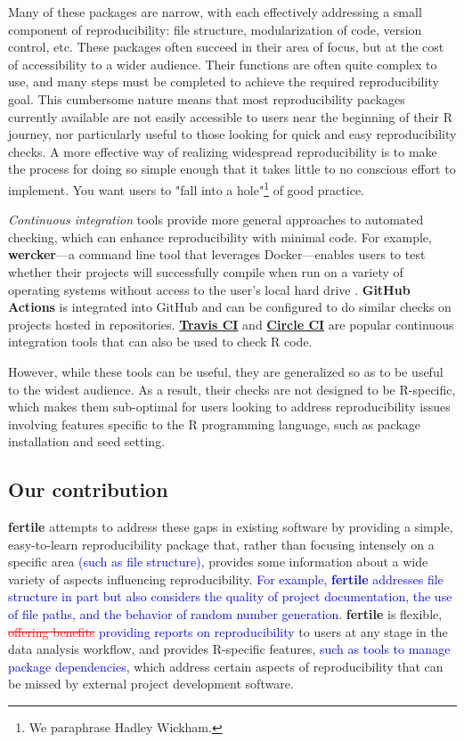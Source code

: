 \documentclass[APA,LATO1COL]{WileyNJD-v2}\usepackage[]{graphicx}\usepackage[]{color}
\newcommand{\R}{\textsf{R}\xspace}
\newcommand{\pkg}[1]{\textbf{#1}}
\begin{document}
Many of these packages are narrow, with each effectively addressing a small component of reproducibility: file structure, modularization of code, version control, etc. These packages often  succeed in their area of focus, but at the cost of accessibility to a wider audience. Their functions are often quite complex to use, and many steps must be completed to achieve the required reproducibility goal. This cumbersome nature means that most reproducibility packages currently available are not easily accessible to users near the beginning of their \R journey, nor particularly useful to those looking for quick and easy reproducibility checks.
A more effective way of realizing widespread reproducibility is to make the process for doing so simple enough that it takes little to no conscious effort to implement. You want users to "fall into a hole"\footnote{We paraphrase Hadley Wickham.} of good practice. 

\emph{Continuous integration} tools provide more general approaches to automated checking, which can enhance reproducibility with minimal code. For example, \pkg{wercker}---a command line tool that leverages Docker---enables users to test whether their projects will successfully compile when run on a variety of operating systems without access to the user's local hard drive \citep{wercker}. \pkg{GitHub Actions} is integrated into GitHub and can be configured to do similar checks on projects hosted in repositories. \href{https://travis-ci.com}{\pkg{Travis CI}} and \href{https://circleci.com/product}{\pkg{Circle CI}} are popular continuous integration tools that can also be used to check \R code. 

However, while these tools can be useful, they are generalized so as to be useful to the widest audience. As a result, their checks are not designed to be \R-specific, which makes them sub-optimal for users looking to address reproducibility issues involving features specific to the \R programming language, such as package installation and seed setting.

\subsection{Our contribution}

\pkg{fertile} attempts to address these gaps in existing software by providing a simple, easy-to-learn reproducibility package that, rather than focusing intensely on a specific area \textcolor{blue}{(such as file structure)}, provides some information about a wide variety of aspects influencing reproducibility. \textcolor{blue}{For example, \pkg{fertile} addresses file structure in part but also considers the quality of project documentation, the use of file paths, and the behavior of random number generation}. \pkg{fertile} is flexible, \textcolor{red}{\st{offering benefits}} \textcolor{blue}{providing reports on reproducibility} to users at any stage in the data analysis workflow, and provides \R-specific features, \textcolor{blue}{such as tools to manage package dependencies}, which address certain aspects of reproducibility that can be missed by external project development software.
\end{document}
